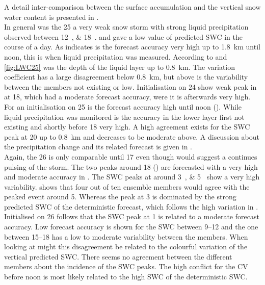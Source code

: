 A detail inter-comparison between the surface accumulation and the vertical snow water content is presented in .
\\
In general was the \SI{25}{\dec} a very weak snow storm with strong liquid precipitation observed between \SIlist{12;18}{\UTC}.  and  gave a low value of predicted SWC in the course of a day. As  indicates is the forecast accuracy very high up to \SI{1.8}{\km} until noon, this is when liquid precipitation was measured. According to  and \ref{fig:LWC25} was the depth of the liquid layer up to \SI{0.8}{\km}. The variation coefficient has a large disagreement below \SI{0.8}{\km}, but above is the variability between the members not existing or low. Initialisation on \SI{24}{\dec} show weak peak in  at \SI{18}{\UTC}, which had a moderate forecast accuracy, were it is afterwards very high. For an initialisation on \SI{25}{\dec} is the forecast accuracy high until noon (). While liquid precipitation was monitored is the accuracy in the lower layer first not existing and shortly before \SI{18}{\UTC} very high. A high agreement exists for the SWC peak at \SI{20}{\UTC} up to \SI{0.8}{\km} and decreases to be moderate above. A discussion about the precipitation change and its related forecast is given in .
\\
Again, the \SI{26}{\dec} is only comparable until \SI{17}{\UTC} even though  would suggest a continues pulsing of the storm. The two peaks around \SI{18}{\UTC} () are forecasted with a very high and moderate accuracy in . The SWC peaks at around \SIlist{3;5}{\UTC} show a very high variability.  shows that four out of ten ensemble members would agree with the peaked event around \SI{5}{\UTC}. Whereas the peak at \SI{3}{\UTC} is dominated by the strong predicted SWC of the deterministic forecast, which follows the high variation in . 
Initialised on \SI{26}{\dec} follows that the SWC peak at \SI{1}{\UTC} is related to a moderate forecast accuracy. Low forecast accuracy is shown for the SWC between \SIrange{9}{12}{\UTC} and the one between \SIrange{15}{18}{\UTC} has a low to moderate variability between the members.  When looking at  might this disagreement be related to the colourful variation of the vertical predicted SWC. There seems no agreement between the different members about the incidence of the SWC peaks. The high conflict for the CV before noon is most likely related to the high SWC of the deterministic SWC. 
